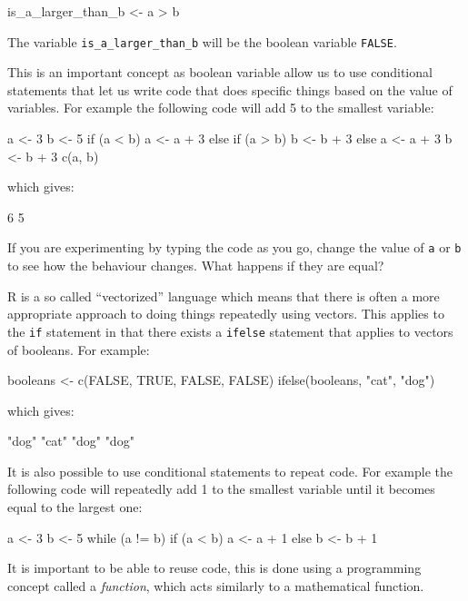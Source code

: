 \begin{Rin}
is_a_larger_than_b <- a > b
\end{Rin}

The variable \texttt{is_a_larger_than_b} will be the boolean variable
\texttt{FALSE}.

This is an important concept as boolean variable allow us to use conditional
statements that let us write code that does specific things based on the value
of variables. For example the following code will add 5 to the smallest
variable:

\begin{Rin}
a <- 3
b <- 5
if (a < b) {
  a <- a + 3
} else if (a > b) {
  b <- b + 3
} else {
  a <- a + 3
  b <- b + 3
}
c(a, b)
\end{Rin}

which gives:

\begin{Rout}
6 5
\end{Rout}

If you are experimenting by typing the code as you go, change the value of
\texttt{a} or \texttt{b} to see how the behaviour changes.
What happens if they are equal?

R is a so called ``vectorized'' language which means that there is often a more
appropriate approach to doing things repeatedly using vectors. This applies to
the \texttt{if} statement in that there exists a \texttt{ifelse}
statement that applies to vectors of booleans. For example:

\begin{Rin}
booleans <- c(FALSE, TRUE, FALSE, FALSE)
ifelse(booleans, "cat", "dog")
\end{Rin}

which gives:

\begin{Rout}
"dog" "cat" "dog" "dog"
\end{Rout}

It is also possible to use conditional statements to repeat code. For
example the following code will repeatedly add 1 to the smallest variable until
it becomes equal to the largest one:

\begin{Rin}
a <- 3
b <- 5
while (a != b) {
  if (a < b) {
    a <- a + 1
  }
  else {
    b <- b + 1
  }
}
\end{Rin}

It is important to be able to reuse code, this is done using a programming
concept called a \textit{function}, which acts similarly to a mathematical
function.

